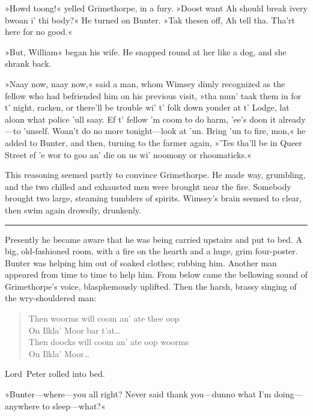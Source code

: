  »Howd toong!« yelled Grimethorpe, in a fury. »Doost want Ah should break ivery bwoan i' thi body?« He turned on Bunter. »Tak thesen off, Ah tell tha. Tha'rt here for no good.«

»But, William\longdash« began his wife. He snapped round at her like a dog, and she shrank back.

»Naay now, naay now,« said a man, whom Wimsey dimly recognized as the fellow who had befriended him on his previous visit, »tha mun' taak them in for t' night, racken, or there'll be trouble wi' t' folk down yonder at t' Lodge, lat aloan what police 'ull saay. Ef t' fellow 'm coom to do harm, 'ee's doon it already—to 'unself. Woan't do no more tonight—look at 'un. Bring 'un to fire, mon,« he added to Bunter, and then, turning to the farmer again, »'Tes tha'll be in Queer Street ef 'e wor to goo an' die on us wi' noomony or rhoomaticks.«

This reasoning seemed partly to convince Grimethorpe. He made way, grumbling, and the two chilled and exhausted men were brought near the fire. Somebody brought two large, steaming tumblers of spirits.  Wimsey's brain seemed to clear, then swim again drowsily, drunkenly. 

\noindent\hfil\rule{0.5\textwidth}{.4pt}\hfil 

Presently he became aware that he was being carried upstairs and put to bed. A big, old-fashioned room, with a fire on the hearth and a huge, grim four-poster. Bunter was helping him out of soaked clothes; rubbing him. Another man appeared from time to time to help him. From below came the bellowing sound of Grimethorpe's voice, blasphemously uplifted. Then the harsh, brassy singing of the wry-shouldered man: 

\clearpage

\begin{verse}
\begin{altverse}
Then woorms will coom an' ate thee oop\\
On Ilkla' Moor bar t'at\dots\\
Then doocks will coom an' ate oop woorms\\
On Ilkla' Moor\dots\\
\end{altverse}
\end{verse}


Lord~Peter rolled into bed.

»Bunter—where—you all right? Never said thank you—dunno what I'm doing—anywhere to sleep—what?«

